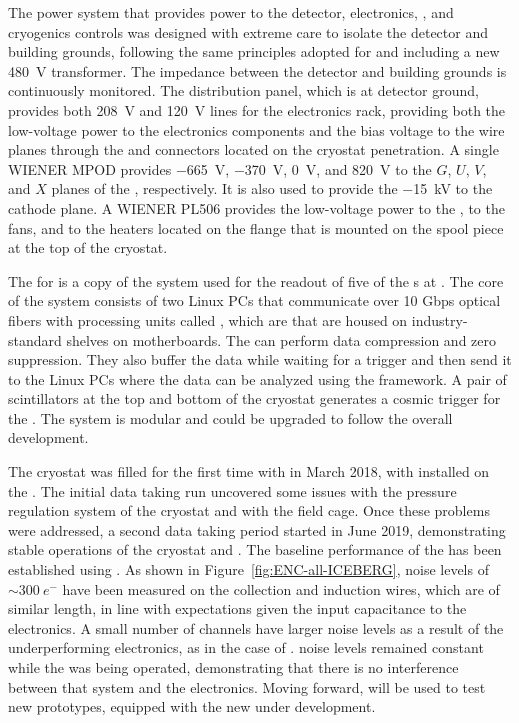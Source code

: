 The  power system that provides power to the detector, electronics, 
, and cryogenics controls was designed with extreme care to 
isolate the detector and building grounds, following the same principles adopted
for  and including a new \SI{480}{V} transformer. The impedance between the detector
and building grounds is continuously monitored. The distribution panel, which is 
at detector ground, provides both \SI{208}{V} and \SI{120}{V} lines for the  electronics rack, 
providing both the low-voltage power to the  electronics components and the bias 
voltage to the  wire planes through the  and 
connectors located on the cryostat penetration. A single WIENER MPOD provides 
\SI{-665}{V}, \SI{-370}{V}, \SI{0}{V}, and \SI{820}{V} to the $G$, $U$, $V$, and 
$X$ planes of the , respectively. It is also used to provide the 
\SI{-15}{kV} to the cathode plane. A WIENER PL506 provides the low-voltage
power to the , to the fans, and to the heaters located on the 
flange that is mounted on the spool piece at the top of the cryostat. 

The  for  is a copy of the system used for the readout
of five of the  s at . The core of the  system 
consists of two Linux PCs that communicate over 10 Gbps optical fibers
with processing units called , which are  that are
housed on industry-standard  shelves on  motherboards.
The  can perform data compression and zero suppression. They also buffer
the data while waiting for a trigger and then send it to the Linux PCs where the data can
be analyzed using the  framework. A pair of scintillators at the top and
bottom of the cryostat generates a cosmic trigger for the .
The system is modular and could be upgraded to follow the overall    
development. 

The  cryostat was filled for the first time with 
in March 2018, with   installed on the . The
initial data taking run uncovered some issues with the pressure regulation system of
the cryostat and with the field cage. Once these problems were addressed, a second
data taking period started in June 2019, demonstrating stable operations of the
cryostat and . The baseline performance of the  
 has been established using  . 
As shown in Figure~\ref{fig:ENC-all-ICEBERG}, noise levels of 
$\sim\SI{300}{e^-}$ have been measured on the collection and induction wires,
which are of similar length, in line with expectations given the input capacitance
to the  electronics. A small number of channels have larger noise levels as a
result of the underperforming  electronics, as in the case of .
 noise levels remained constant while the  was
being operated, demonstrating that there is no interference between that system
and the  electronics. Moving forward,  will be used to
test new  prototypes, equipped with the new  under
development. 

